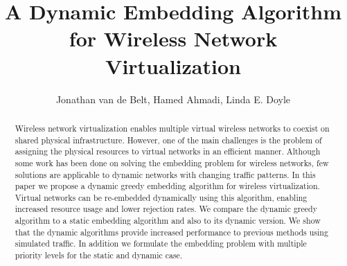 \documentclass[conference]{IEEEtran}
\begin{document}
\title{A Dynamic Embedding Algorithm for Wireless Network Virtualization}


\author{\IEEEauthorblockN{}
Jonathan van de Belt, Hamed Ahmadi, Linda E. Doyle
}














\maketitle


\begin{abstract}
Wireless network virtualization enables multiple virtual wireless networks to coexist on shared physical infrastructure. However, one of
the main challenges is the problem of assigning the physical resources to virtual networks in an efficient manner. Although some work has
been done on solving the embedding problem for wireless networks, few solutions are applicable to dynamic networks with changing traffic
patterns. In this paper we propose a dynamic greedy embedding algorithm for wireless virtualization. Virtual networks can be re-embedded
dynamically using this algorithm, enabling increased resource usage and lower rejection rates. We compare the dynamic greedy algorithm to a
static embedding algorithm and also to its dynamic version. We show that the dynamic algorithms provide increased performance to
previous methods using simulated traffic. In addition we formulate the embedding problem with multiple priority levels for the static and dynamic case.
\end{abstract}







\IEEEpeerreviewmaketitle
\end{document}
